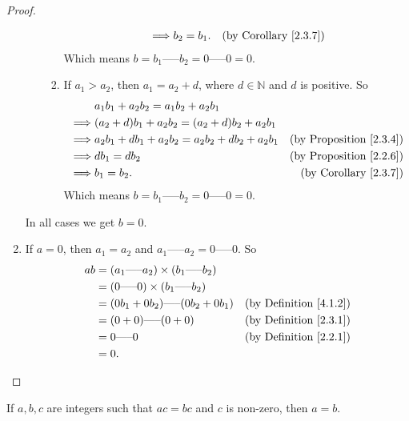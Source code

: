 \begin{proof}
\begin{enumerate}
\begin{enumerate}[label=(\roman*)]
\begin{enumerate}[label=(\arabic*)]
\begin{align*}
                            \implies & b_2 = b_1. & \text{(by Corollary \ref{2.3.7})}
                        \end{align*}
                    Which means \(b = b_1 \text{-----} b_2 = 0 \text{-----} 0 = 0\).
                    \item If \(a_1 > a_2\), then \(a_1 = a_2 + d\), where \(d \in \mathds{N}\) and \(d\) is positive.
                    So
                        \begin{align*}
                            & a_1b_1 + a_2b_2 = a_1b_2 + a_2b_1 \\
                            \implies & (a_2 + d)b_1 + a_2b_2 = (a_2 + d)b_2 + a_2b_1 \\
                            \implies & a_2b_1 + db_1 + a_2b_2 = a_2b_2 + db_2 + a_2b_1 & \text{(by Proposition \ref{2.3.4})} \\
                            \implies & db_1 = db_2 & \text{(by Proposition \ref{2.2.6})} \\
                            \implies & b_1 = b_2. & \text{(by Corollary \ref{2.3.7})}
                        \end{align*}
                    Which means \(b = b_1 \text{-----} b_2 = 0 \text{-----} 0 = 0\).
                \end{enumerate}
            \end{enumerate}
        In all cases we get \(b = 0\).
        \item If \(a = 0\), then \(a_1 = a_2\) and \(a_1 \text{-----} a_2 = 0 \text{-----} 0\).
        So
        \begin{align*}
            ab &= (a_1 \text{-----} a_2) \times (b_1 \text{-----} b_2) \\
            &= (0 \text{-----} 0) \times (b_1 \text{-----} b_2) \\
            &= (0b_1 + 0b_2) \text{-----} (0b_2 + 0b_1) & \text{(by Definition \ref{4.1.2})} \\
            &= (0 + 0) \text{-----} (0 + 0) & \text{(by Definition \ref{2.3.1})} \\
            &= 0 \text{-----} 0 & \text{(by Definition \ref{2.2.1})} \\
            &= 0.
        \end{align*}
    \end{enumerate}
\end{proof}

\begin{corollary}\label{4.1.9}
If \(a, b, c\) are integers such that \(ac = bc\) and \(c\) is non-zero, then \(a = b\).
\end{corollary}

